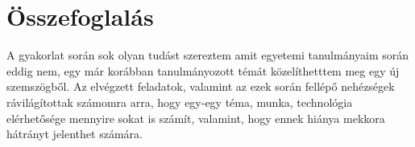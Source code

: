 \section*{Összefoglalás}
A gyakorlat során sok olyan tudást szereztem amit egyetemi tanulmányaim során eddig nem, egy már korábban tanulmányozott témát közelíthetttem meg egy új szemszögből. Az elvégzett feladatok, valamint az ezek során fellépő nehézségek rávilágítottak számomra arra, hogy egy-egy téma, munka, technológia elérhetősége mennyire sokat is számít, valamint, hogy ennek hiánya mekkora hátrányt jelenthet számára.

